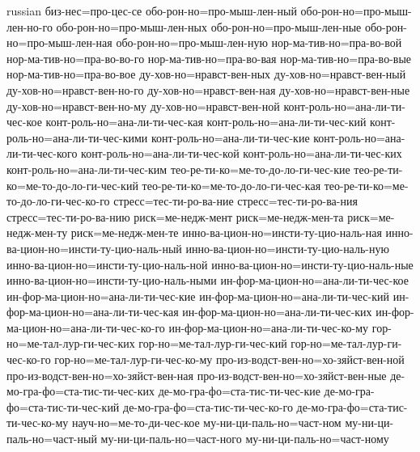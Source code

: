 \begin{hyphenrules}{russian}
{        биз-нес=про-цес-се
        обо-рон-но=про-мыш-лен-ный
        обо-рон-но=про-мыш-лен-но-го
        обо-рон-но=про-мыш-лен-ных
        обо-рон-но=про-мыш-лен-ные
        обо-рон-но=про-мыш-лен-ная
        обо-рон-но=про-мыш-лен-ную
        нор-ма-тив-но=пра-во-вой
        нор-ма-тив-но=пра-во-во-го
        нор-ма-тив-но=пра-во-вая
        нор-ма-тив-но=пра-во-вые
        нор-ма-тив-но=пра-во-вое
        ду-хов-но=нравст-вен-ных
        ду-хов-но=нравст-вен-ный
        ду-хов-но=нравст-вен-но-го
        ду-хов-но=нравст-вен-ная
        ду-хов-но=нравст-вен-ные
        ду-хов-но=нравст-вен-но-му
        ду-хов-но=нравст-вен-ной
        конт-роль-но=ана-ли-ти-чес-кое
        конт-роль-но=ана-ли-ти-чес-кая
        конт-роль-но=ана-ли-ти-чес-кий
        конт-роль-но=ана-ли-ти-чес-кими
        конт-роль-но=ана-ли-ти-чес-кие
        конт-роль-но=ана-ли-ти-чес-кого
        конт-роль-но=ана-ли-ти-чес-кой
        конт-роль-но=ана-ли-ти-чес-ких
        конт-роль-но=ана-ли-ти-чес-ким
        тео-ре-ти-ко=ме-то-до-ло-ги-чес-кие
        тео-ре-ти-ко=ме-то-до-ло-ги-чес-кий
        тео-ре-ти-ко=ме-то-до-ло-ги-чес-кая
        тео-ре-ти-ко=ме-то-до-ло-ги-чес-ко-го
        стресс=тес-ти-ро-ва-ние
        стресс=тес-ти-ро-ва-ния
        стресс=тес-ти-ро-ва-нию
        риск=ме-недж-мент
        риск=ме-недж-мен-та
        риск=ме-недж-мен-ту
        риск=ме-недж-мен-те
        инно-ва-цион-но=инсти-ту-цио-наль-ная
        инно-ва-цион-но=инсти-ту-цио-наль-ный
        инно-ва-цион-но=инсти-ту-цио-наль-ную
        инно-ва-цион-но=инсти-ту-цио-наль-ной
        инно-ва-цион-но=инсти-ту-цио-наль-ные
        инно-ва-цион-но=инсти-ту-цио-наль-ными
        ин-фор-ма-цион-но=ана-ли-ти-чес-кое
        ин-фор-ма-цион-но=ана-ли-ти-чес-кие
        ин-фор-ма-цион-но=ана-ли-ти-чес-кий
        ин-фор-ма-цион-но=ана-ли-ти-чес-кая
        ин-фор-ма-цион-но=ана-ли-ти-чес-ких
        ин-фор-ма-цион-но=ана-ли-ти-чес-ко-го
        ин-фор-ма-цион-но=ана-ли-ти-чес-ко-му
        гор-но=ме-тал-лур-ги-чес-ких
        гор-но=ме-тал-лур-ги-чес-кий
        гор-но=ме-тал-лур-ги-чес-ко-го
        гор-но=ме-тал-лур-ги-чес-ко-му
        про-из-водст-вен-но=хо-зяйст-вен-ной
        про-из-водст-вен-но=хо-зяйст-вен-ная
        про-из-водст-вен-но=хо-зяйст-вен-ные
		де-мо-гра-фо=ста-тис-ти-чес-ких
        де-мо-гра-фо=ста-тис-ти-чес-кие
        де-мо-гра-фо=ста-тис-ти-чес-кий
        де-мо-гра-фо=ста-тис-ти-чес-ко-го
        де-мо-гра-фо=ста-тис-ти-чес-ко-му
        науч-но=ме-то-ди-чес-кое
        му-ни-ци-паль-но=част-ном
        му-ни-ци-паль-но=част-ный
        му-ни-ци-паль-но=част-ного
        му-ни-ци-паль-но=част-ному
}
\end{hyphenrules}
